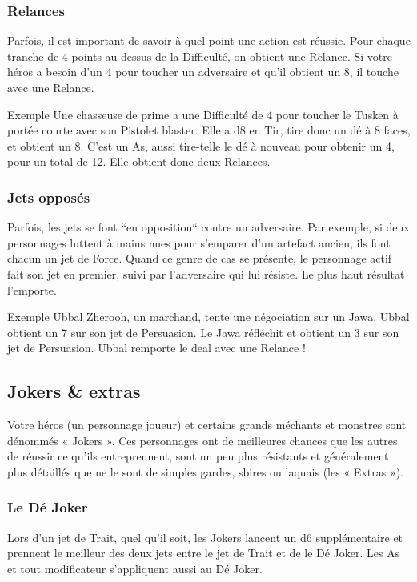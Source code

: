 \subsubsection{Relances}
Parfois, il est important de savoir à quel point une action est réussie. Pour chaque tranche de 4 points au-dessus de la Difficulté, on obtient une Relance. Si votre héros a besoin d’un 4 pour toucher un adversaire et qu’il obtient un 8, il touche avec une Relance.

\begin{commentbox}{Exemple}
Une chasseuse de prime a une Difficulté de 4 pour toucher le Tusken à portée courte avec son Pistolet blaster. Elle a d8 en Tir, tire donc un dé à 8 faces, et obtient un 8. C’est un As, aussi tire-telle le dé à nouveau pour obtenir un 4, pour un total de 12. Elle obtient donc deux Relances.
\end{commentbox}

\subsubsection{Jets opposés}
Parfois, les jets se font “en opposition“ contre un adversaire. Par exemple, si deux personnages luttent à mains nues pour s’emparer d’un artefact ancien, ils font chacun un jet de Force. Quand ce genre de cas se présente, le personnage actif fait son jet en premier, suivi par l’adversaire qui lui résiste. Le plus haut résultat l’emporte.

\begin{commentbox}{Exemple}
Ubbal Zherooh, un marchand, tente une négociation sur un Jawa. Ubbal obtient un 7 sur son jet de Persuasion. Le Jawa réfléchit et obtient un 3 sur son jet de Persuasion. Ubbal remporte le deal avec une Relance !
\end{commentbox}


\subsection{Jokers \& extras}
Votre héros (un personnage joueur) et certains grands méchants et monstres sont dénommés « Jokers ». Ces personnages ont de meilleures chances que les autres de réussir ce qu’ils entreprennent, sont un peu plus résistants et généralement plus détaillés que ne le sont de simples gardes, sbires ou laquais (les « Extras »).

\subsubsection{Le Dé Joker}
Lors d’un jet de Trait, quel qu’il soit, les Jokers lancent un d6 supplémentaire et prennent le meilleur des deux jets entre le jet de Trait et de le Dé Joker. Les As et tout modificateur s’appliquent aussi au Dé Joker.

